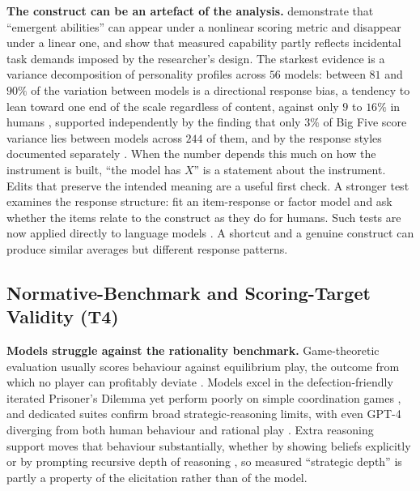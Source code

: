 \documentclass[11pt]{article}
\begin{document}
\textbf{The construct can be an artefact of the analysis.}
\citet{schaeffer2023mirage} demonstrate that ``emergent abilities'' can appear
under a nonlinear scoring metric and disappear under a linear one, and
\citet{hufrank2024auxiliary} show that measured capability partly
reflects incidental task demands imposed by the researcher's design. The
starkest evidence is a variance decomposition of personality profiles across
$56$ models: between $81$ and $90\%$ of the variation between models is a
directional response bias, a tendency to lean toward one end of the scale
regardless of content, against only $9$ to $16\%$ in humans
\cite{meyer2026apparent}, supported independently by the finding that only $3\%$
of Big Five score variance lies between models across $244$ of them, and by the
response styles documented separately
\cite{zierahn2026without,salecha2024social,braun2025acquiescence}. When the number depends this much on how the
instrument is built, ``the model has $X$'' is a statement about the instrument.
Edits that preserve the intended meaning are a useful first check. A stronger
test examines the response structure: fit an item-response or factor model and
ask whether the items relate to the construct as they do for humans. Such tests
are now applied directly to language models
\cite{rodriguez2021irt,zhou2025lost,wang2025emulate}. A shortcut and a genuine
construct can produce similar averages but different response patterns.

\subsection{Normative-Benchmark and Scoring-Target Validity (T4)}
\label{sec:t4}

\textbf{Models struggle against the rationality benchmark.} Game-theoretic
evaluation usually scores behaviour against equilibrium play, the outcome from
which no player can profitably deviate \cite{nash1950equilibrium}. Models excel
in the defection-friendly iterated Prisoner's Dilemma yet perform poorly on
simple coordination games \cite{akata2025playing}, and dedicated suites confirm
broad strategic-reasoning limits, with even GPT-4 diverging from both human
behaviour and rational play
\cite{duan2024gtbench,huang2025gama,fan2024rational,light2023avalonbench}.
Extra reasoning support moves that behaviour substantially, whether by showing beliefs
explicitly \cite{gandhi2023strategic} or by prompting recursive depth of
reasoning \cite{zhang2024klevel}, so measured ``strategic depth'' is partly a
property of the elicitation rather than of the model.
\end{document}
